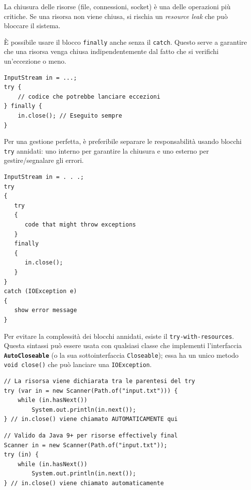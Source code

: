 La chiusura delle risorse (file, connessioni, socket) è una delle operazioni più critiche. Se una risorsa non viene chiusa, si rischia un \textit{resource leak} che può bloccare il sistema.

È possibile usare il blocco \texttt{finally} anche senza il \texttt{catch}. Questo serve a garantire che una risorsa venga chiusa indipendentemente dal fatto che si verifichi un'eccezione o meno.

\begin{lstlisting}[caption={Utilizzo di try-finally per la chiusura risorse}]
InputStream in = ...;
try {
    // codice che potrebbe lanciare eccezioni
} finally {
    in.close(); // Eseguito sempre
}
\end{lstlisting}

Per una gestione perfetta, è preferibile separare le responsabilità usando blocchi \texttt{try} annidati: uno interno per garantire la chiusura e uno esterno per gestire/segnalare gli errori.
\begin{lstlisting}[caption={un tipico pattern di \texttt{try} annidati}]
InputStream in = . . .;
try
{
   try
   {
      code that might throw exceptions
   }
   finally
   {
      in.close();
   }
}
catch (IOException e)
{
   show error message
}
\end{lstlisting}

Per evitare la complessità dei blocchi annidati, esiste il \texttt{try-with-resources}. Questa sintassi può essere usata con qualsiasi classe che implementi l'interfaccia \textbf{\texttt{AutoCloseable}} (o la sua sottointerfaccia \texttt{Closeable}); essa ha un unico metodo \texttt{void close()} che può lanciare una \texttt{IOException}.

\begin{lstlisting}[caption={Sintassi del try-with-resources}]
// La risorsa viene dichiarata tra le parentesi del try
try (var in = new Scanner(Path.of("input.txt"))) {
    while (in.hasNext())
        System.out.println(in.next());
} // in.close() viene chiamato AUTOMATICAMENTE qui
\end{lstlisting}

\begin{lstlisting}[caption={Sintassi del try-with-resources: variante a partire da Java 9+}]
// Valido da Java 9+ per risorse effectively final
Scanner in = new Scanner(Path.of("input.txt"));
try (in) {
    while (in.hasNext())
        System.out.println(in.next());
} // in.close() viene chiamato automaticamente
\end{lstlisting}

